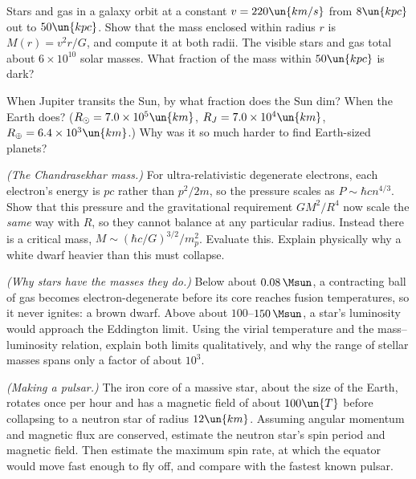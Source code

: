 \begin{problems}
\core \label{prob:rotation} Stars and gas in a galaxy orbit at a constant $v = 220\un{km/s}$ from $8\un{kpc}$ out to $50\un{kpc}$. Show that the mass enclosed within radius $r$ is $M(r) = v^2r/G$, and compute it at both radii. The visible stars and gas total about $6\times10^{10}$ solar masses. What fraction of the mass within $50\un{kpc}$ is dark?

 \label{prob:transit} When Jupiter transits the Sun, by what fraction does the Sun dim? When the Earth does? ($R_\odot = 7.0\times10^{5}\un{km}$, $R_J = 7.0\times10^{4}\un{km}$, $R_\oplus = 6.4\times10^{3}\un{km}$.) Why was it so much harder to find Earth-sized planets?

\core \label{prob:chandra} \emph{(The Chandrasekhar mass.)} For ultra-relativistic degenerate electrons, each electron's energy is $pc$ rather than $p^2/2m$, so the pressure scales as $P\sim\hbar cn^{4/3}$. Show that this pressure and the gravitational requirement $GM^2/R^4$ now scale the \emph{same} way with $R$, so they cannot balance at any particular radius. Instead there is a critical mass, $M\sim(\hbar c/G)^{3/2}/m_p^2$. Evaluate this. Explain physically why a white dwarf heavier than this must collapse.

 \emph{(Why stars have the masses they do.)} Below about $0.08\,\Msun$, a contracting ball of gas becomes electron-degenerate before its core reaches fusion temperatures, so it never ignites: a brown dwarf. Above about $100$--$150\,\Msun$, a star's luminosity would approach the Eddington limit. Using the virial temperature and the mass--luminosity relation, explain both limits qualitatively, and why the range of stellar masses spans only a factor of about $10^3$.

 \emph{(Making a pulsar.)} The iron core of a massive star, about the size of the Earth, rotates once per hour and has a magnetic field of about $100\un{T}$ before collapsing to a neutron star of radius $12\un{km}$. Assuming angular momentum and magnetic flux are conserved, estimate the neutron star's spin period and magnetic field. Then estimate the maximum spin rate, at which the equator would move fast enough to fly off, and compare with the fastest known pulsar.
\end{problems}

\begin{reading}
\end{reading}
